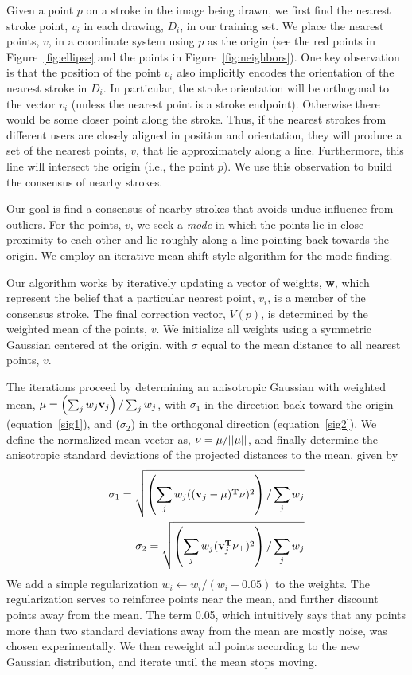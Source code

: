 Given a point $p$ on a stroke in the image being drawn, we first find the nearest stroke point, $v_i$ in each drawing, $D_i$, in our training set. We place the nearest points, $v$, in a coordinate system using $p$ as the origin (see the red points in Figure~\ref{fig:ellipse} and the points in Figure~\ref{fig:neighbors}). One key observation is that the position of the point $v_i$ also implicitly encodes the orientation of the nearest stroke in $D_i$. In particular, the stroke orientation will be orthogonal to the vector $v_i$ (unless the nearest point is a stroke endpoint). Otherwise there would be some closer point along the stroke. Thus, if the nearest strokes from different users are closely aligned in position and orientation, they will produce a set of the nearest points, $v$, that lie approximately along a line. Furthermore, this line will intersect the origin (i.e., the point $p$). We use this observation to build the consensus of nearby strokes.

Our goal is find a consensus of nearby strokes that avoids undue influence from outliers. For the points, $v$, we seek a {\em mode} in which the points lie in close proximity to each other and lie roughly along a line pointing back towards the origin. We employ an iterative mean shift style algorithm for the mode finding.

Our algorithm works by iteratively updating a vector of weights, {\bf w}, which represent the belief that a particular nearest point, $v_i$, is a member of the consensus stroke. The final correction vector, $V(p)$, is determined by the weighted mean of the points, $v$. We initialize all weights using a symmetric Gaussian centered at the origin, with $\sigma$ equal to the mean distance to all nearest points, $v$.

The iterations proceed by determining an anisotropic Gaussian with weighted mean, ${\bf \mu} = \left(\sum_j w_j {\bf v}_j\right) / \sum_j w_j$, with
$\sigma_1$ in the direction back toward the origin (equation~\ref{sig1}), and ($\sigma_2$) in the orthogonal direction (equation~\ref{sig2}). 
We define the normalized mean vector as, ${\bf \nu} = \mu/||\mu|| $,
and finally determine the anisotropic standard deviations of the projected distances to the mean, given by
\begin{eqnarray}
\sigma_1 =  \sqrt{\left(\sum_j w_j (({\bf v}_j-\mu)^{\bf T}\nu)^2\right) / \sum_j w_j} \label{sig1}\\
\sigma_2 =  \sqrt{\left(\sum_j w_j ({\bf v}_j^{\bf T}\nu_\perp)^2\right) / \sum_j w_j} \label{sig2}
\end{eqnarray}
We add a simple regularization $w_i \leftarrow w_i/ (w_i+0.05)$ to the weights.  The regularization serves to reinforce points near the mean, and further discount points away from the mean. The term 0.05, which intuitively says that any points more than two standard deviations away from the mean are mostly noise, was chosen experimentally. We then reweight all points according to the new Gaussian distribution, and iterate until the mean stops moving.

